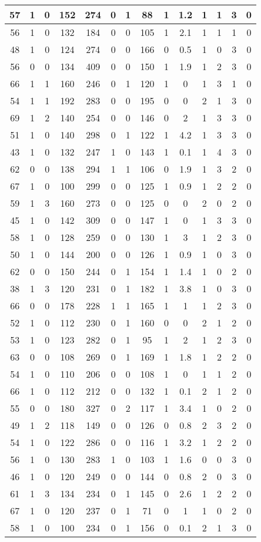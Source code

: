 \documentclass{article}
\begin{document}
\begin{tabular}{
|c|c|c|c|c|c|c|c|c|c|c|c|c|c|}
\hline
57&1&0&152&274&0&1&88&1&1.2&1&1&3&0 \\
\hline
56&1&0&132&184&0&0&105&1&2.1&1&1&1&0 \\
\hline
48&1&0&124&274&0&0&166&0&0.5&1&0&3&0 \\
\hline
56&0&0&134&409&0&0&150&1&1.9&1&2&3&0 \\
\hline
66&1&1&160&246&0&1&120&1&0&1&3&1&0 \\
\hline
54&1&1&192&283&0&0&195&0&0&2&1&3&0 \\
\hline
69&1&2&140&254&0&0&146&0&2&1&3&3&0 \\
\hline
51&1&0&140&298&0&1&122&1&4.2&1&3&3&0 \\
\hline
43&1&0&132&247&1&0&143&1&0.1&1&4&3&0 \\
\hline
62&0&0&138&294&1&1&106&0&1.9&1&3&2&0 \\
\hline
67&1&0&100&299&0&0&125&1&0.9&1&2&2&0 \\
\hline
59&1&3&160&273&0&0&125&0&0&2&0&2&0 \\
\hline
45&1&0&142&309&0&0&147&1&0&1&3&3&0 \\
\hline
58&1&0&128&259&0&0&130&1&3&1&2&3&0 \\
\hline
50&1&0&144&200&0&0&126&1&0.9&1&0&3&0 \\
\hline
62&0&0&150&244&0&1&154&1&1.4&1&0&2&0 \\
\hline
38&1&3&120&231&0&1&182&1&3.8&1&0&3&0 \\
\hline
66&0&0&178&228&1&1&165&1&1&1&2&3&0 \\
\hline
52&1&0&112&230&0&1&160&0&0&2&1&2&0 \\
\hline
53&1&0&123&282&0&1&95&1&2&1&2&3&0 \\
\hline
63&0&0&108&269&0&1&169&1&1.8&1&2&2&0 \\
\hline
54&1&0&110&206&0&0&108&1&0&1&1&2&0 \\
\hline
66&1&0&112&212&0&0&132&1&0.1&2&1&2&0 \\
\hline
55&0&0&180&327&0&2&117&1&3.4&1&0&2&0 \\
\hline
49&1&2&118&149&0&0&126&0&0.8&2&3&2&0 \\
\hline
54&1&0&122&286&0&0&116&1&3.2&1&2&2&0 \\
\hline
56&1&0&130&283&1&0&103&1&1.6&0&0&3&0 \\
\hline
46&1&0&120&249&0&0&144&0&0.8&2&0&3&0 \\
\hline
61&1&3&134&234&0&1&145&0&2.6&1&2&2&0 \\
\hline
67&1&0&120&237&0&1&71&0&1&1&0&2&0 \\
\hline
58&1&0&100&234&0&1&156&0&0.1&2&1&3&0 \\

\end{tabular}
\end{document}
